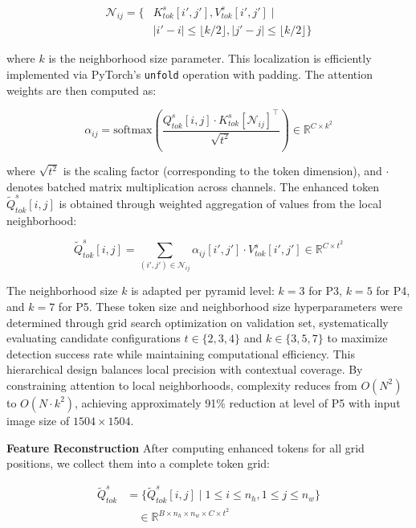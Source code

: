 \begin{equation}
\begin{aligned}
\mathcal{N}_{ij} = \{&K^s_{tok}[i', j'], V^s_{tok}[i', j'] \mid \\
&|i'-i| \leq \lfloor k/2 \rfloor, |j'-j| \leq \lfloor k/2 \rfloor\}
\end{aligned}
\end{equation}

where $k$ is the neighborhood size parameter. This localization is efficiently implemented via PyTorch's \texttt{unfold} operation with padding. The attention weights are then computed as:

\begin{equation}
\alpha_{ij} = \text{softmax}\left(\frac{Q^s_{tok}[i,j] \cdot K^s_{tok}[\mathcal{N}_{ij}]^\top}{\sqrt{t^2}}\right) \in \mathbb{R}^{C \times k^2}
\end{equation}

where $\sqrt{t^2}$ is the scaling factor (corresponding to the token dimension), and $\cdot$ denotes batched matrix multiplication across channels. The enhanced token $\widetilde{Q}^s_{tok}[i,j]$ is obtained through weighted aggregation of values from the local neighborhood:

\begin{equation}
\widetilde{Q}^s_{tok}[i,j] = \sum_{(i',j') \in \mathcal{N}_{ij}} \alpha_{ij}[i',j'] \cdot V^s_{tok}[i',j'] \in \mathbb{R}^{C \times t^2}
\end{equation}

The neighborhood size $k$ is adapted per pyramid level: $k=3$ for P3, $k=5$ for P4, and $k=7$ for P5. These token size and neighborhood size hyperparameters were determined through grid search optimization on validation set, systematically evaluating candidate configurations $t \in \{2, 3, 4\}$ and $k \in \{3, 5, 7\}$ to maximize detection success rate while maintaining computational efficiency. This hierarchical design balances local precision with contextual coverage. By constraining attention to local neighborhoods, complexity reduces from $O(N^2)$ to $O(N \cdot k^2)$, achieving approximately 91\% reduction at level of P5 with input image size of $1504 \times 1504$.

\textbf{Feature Reconstruction} After computing enhanced tokens for all grid positions, we collect them into a complete token grid:

\begin{equation}
\begin{aligned}
\widetilde{Q}^s_{tok} &= \{\widetilde{Q}^s_{tok}[i,j] \mid 1 \leq i \leq n_h, 1 \leq j \leq n_w\} \\
&\quad \in \mathbb{R}^{B \times n_h \times n_w \times C \times t^2}
\end{aligned}
\end{equation}


